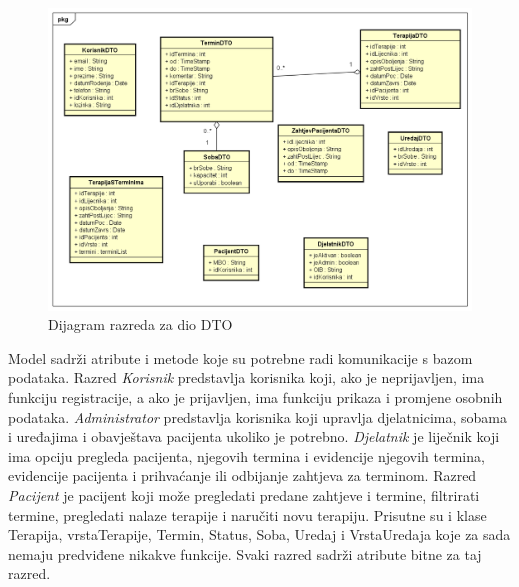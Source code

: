 			\begin{figure}[H]
				\includegraphics[scale=0.3]{slike/Dijagram_razreda_2.PNG} %
				\centering
				\caption{Dijagram razreda za dio DTO}
				\label{fig:dijagram_razreda_2}
			\end{figure}
			
			Model sadrži atribute i metode koje su potrebne radi komunikacije s bazom podataka. Razred \textit{Korisnik} predstavlja korisnika koji, ako je neprijavljen, ima funkciju registracije, a ako je prijavljen, ima funkciju prikaza i promjene osobnih podataka. \textit{Administrator} predstavlja korisnika koji upravlja djelatnicima, sobama i uređajima i obavještava pacijenta ukoliko je potrebno. \textit{Djelatnik} je liječnik koji ima opciju pregleda pacijenta, njegovih termina i evidencije njegovih termina, evidencije pacijenta i prihvaćanje ili odbijanje zahtjeva za terminom. Razred \textit{Pacijent} je pacijent koji može pregledati predane zahtjeve i termine, filtrirati termine, pregledati nalaze terapije i naručiti novu terapiju. Prisutne su i klase Terapija, vrstaTerapije, Termin, Status, Soba, Uredaj i VrstaUredaja koje za sada nemaju predviđene nikakve funkcije. Svaki razred sadrži atribute bitne za taj razred.
			
